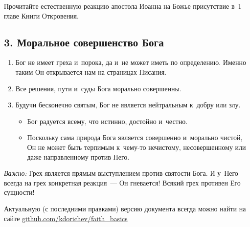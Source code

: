 \documentclass[a4paper,12pt]{article}
\begin{document}
\begin{enumerate}
    Прочитайте естественную реакцию апостола Иоанна на Божье присутствие в~1 главе Книги Откровения.
\end{enumerate}

\subsection{3. Моральное совершенство Бога}

\begin{enumerate}
    \item Бог не имеет греха и~порока, да и~не может иметь по определению. Именно таким Он открывается нам на страницах Писания.
    \item Все решения, пути и~суды Бога морально совершенны.
    \item Будучи бесконечно святым, Бог не является нейтральным к~добру или злу.
    \begin{itemize}
        \item Бог радуется всему, что истинно, достойно и~честно.
        \item Поскольку сама природа Бога является совершенно и~морально чистой, Он не может быть терпимым к~чему-то нечистому, несовершенному или даже направленному против Него. 
    \end{itemize}
\end{enumerate}

\noindent \emph{Важно:} Грех является прямым выступлением против святости Бога. И у~Него всегда на грех конкретная реакция~--- Он гневается! Всякий грех противен Его сущности!

\vfill
\tiny{Актуальную (с последними правками) версию документа всегда можно найти на сайте \href{https://github.com/kdorichev/faith_basics/blob/main/God/lesson_3.3.pdf}{github.com/kdorichev/faith\_basics}}
\end{document}
